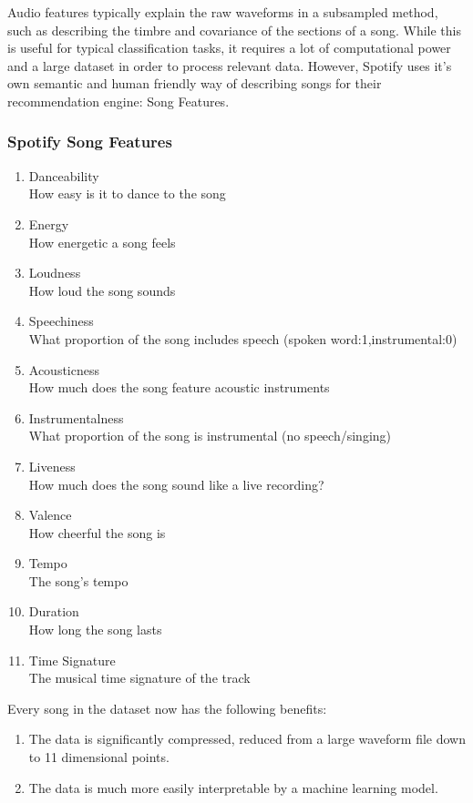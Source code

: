 \documentclass{article}
\begin{document}
        Audio features typically explain the raw waveforms in a subsampled method, such as describing the timbre and covariance of the sections of a song. While this is useful for typical classification tasks, it requires a lot of computational power and a large dataset in order to process relevant data. However, Spotify uses it's own semantic and human friendly way of describing songs for their recommendation engine: Song Features.
        	\subsubsection{Spotify Song Features}
			\begin{enumerate}
                    \item Danceability \\ How easy is it to dance to the song
                    \item Energy \\ How energetic a song feels
                    \item Loudness \\ How loud the song sounds
                    \item Speechiness \\ What proportion of the song includes speech (spoken word:1,instrumental:0)
                    \item Acousticness \\ How much does the song feature acoustic instruments
                    \item Instrumentalness \\ What proportion of the song is instrumental (no speech/singing)
                    \item Liveness \\ How much does the song sound like a live recording?
                    \item Valence \\ How cheerful the song is
                    \item Tempo   \\ The song's tempo
                    \item Duration \\ How long the song lasts
                    \item Time Signature \\ The musical time signature of the track
            \end{enumerate}
		
		Every song in the dataset now has the following benefits: 
		\begin{enumerate}
			\item The data is significantly compressed, reduced from a large waveform file down to 11 dimensional points.
			\item The data is much more easily interpretable by a machine learning model.
		\end{enumerate}
		
\end{document}

